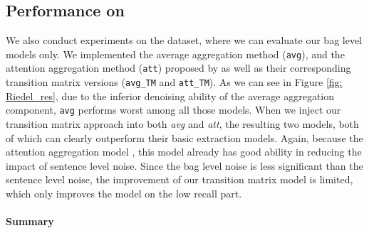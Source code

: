 \subsection{Performance on \EntityRE}
We also conduct experiments on the \EntityRE dataset, where we can evaluate our bag level models only.  
We  implemented the average aggregation method (\texttt{avg}), and the attention aggregation method (\texttt{att}) proposed by \cite{lin2016neural} as well as their corresponding transition matrix versions (\texttt{avg\_TM} and \texttt{att\_TM}). As we can see in Figure \ref{fig: Riedel_res},  due to the inferior denoising ability of the average aggregation component, \texttt{avg} performs worst among all those models. %
When we inject our transition matrix approach into both \emph{avg} and \emph{att}, the resulting two  models, both of which can  clearly outperform their basic extraction models.
%
Again, because the attention aggregation model , this model already has good ability in reducing the impact of sentence level noise. Since the bag level noise is less significant than the sentence level noise, the improvement of our transition matrix model is limited, which only improves the model on the low recall part.

\paragraph{Summary}
